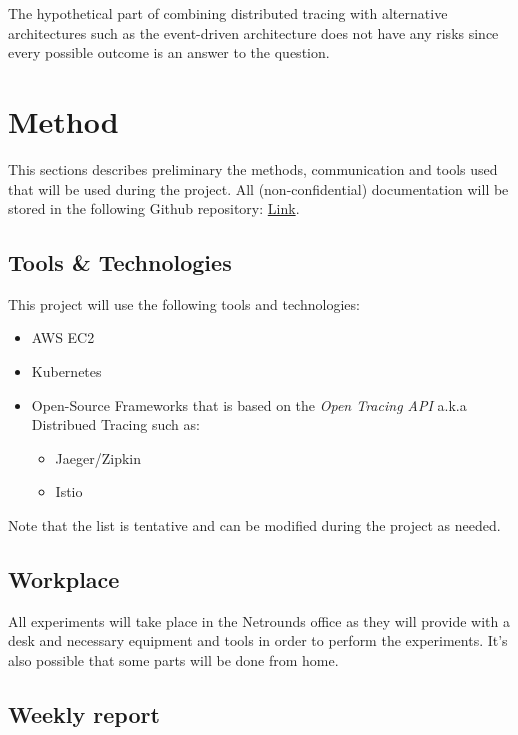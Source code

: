 \documentclass[10pt, titlepage, oneside, a4paper]{article}
\begin{document}
The hypothetical part of combining distributed tracing with alternative architectures such as the event-driven architecture does not have any risks since every possible outcome is an answer to the question. 



\section{Method}

This sections describes preliminary the methods, communication and tools used that will be used during the project. All (non-confidential) documentation will be stored in the following Github repository: \href{https://github.com/NiclasNystrom/Master-Thesis-Distributed-Tracing}{Link}.

\subsection{Tools \& Technologies} \label{sec:tools}
This project will use the following tools and technologies:

\begin{itemize}
	\item AWS EC2
	\item Kubernetes
	\item Open-Source Frameworks that is based on the \textit{Open Tracing API} a.k.a Distribued Tracing such as:
	\begin{itemize}
    	\item Jaeger/Zipkin
    	\item Istio
    \end{itemize}
\end{itemize}

Note that the list is tentative and can be modified during the project as needed.




\subsection{Workplace}
All experiments will take place in the Netrounds office as they will provide with a desk and necessary equipment and tools in order to perform the experiments. It's also possible that some parts will be done from home.

\subsection{Weekly report}
\end{document}
